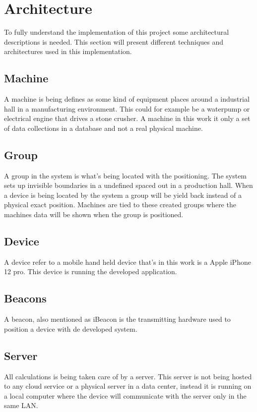 \section{Architecture}\label{sec:implArchitecture}
To fully understand the implementation of this project some architectural descriptions is needed.
This section will present different techniques and architectures used in this implementation.


\subsection{Machine}\label{sec:implArchitectureMachine}
A machine is being defines as some kind of equipment places around a industrial hall in a manufacturing environment.
This could for example be a waterpump or electrical engine that drives a stone crusher.
A machine in this work it only a set of data collections in a database and not a real physical machine.


\subsection{Group}\label{sec:implArchitectureGroup}
A group in the system is what's being located with the positioning.
The system sets up invisible boundaries in a undefined spaced out in a production hall.
When a device is being located by the system a group will be yield back instead of a physical exact position.
Machines are tied to these created groups where the machines data will be shown when the group is positioned.


\subsection{Device}\label{sec:implArchitectureDevice}
A device refer to a mobile hand held device that's in this work is a Apple iPhone 12 pro.
This device is running the developed application.


\subsection{Beacons}\label{sec:implArchitectureBeacons}
A beacon, also mentioned as iBeacon is the transmitting hardware used to position a device with de developed system.


\subsection{Server}\label{sec:implArchitectureServer}
All calculations is being taken care of by a server.
This server is not being hosted to any cloud service or a physical server in a data center, instead it is running on a local computer where the device will communicate with the server only in the same LAN.


